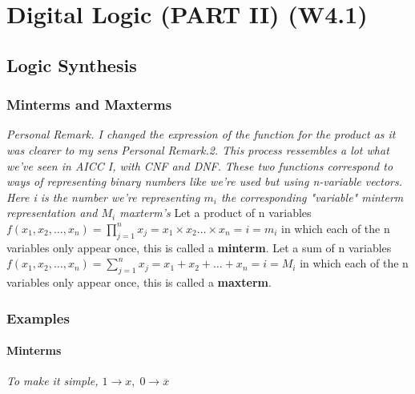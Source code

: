 \documentclass[12pt,openany]{book}
\begin{document}
			      	        
			      	        
			      	\chapter{Digital Logic (PART II) (W4.1)}
			      	\section{Logic Synthesis}
			      	\subsection{Minterms and Maxterms}
			      	\textit{Personal Remark. I changed the expression of the function for the product as it was clearer to my sens} \newline
			      	\vspace{10px}
			      	\textit{Personal Remark.2. This process ressembles a lot what we've seen in AICC I, with CNF and DNF.} \newline
			      	\vspace{10px}
			      	\textit{These two functions correspond to ways of representing binary numbers like we're used but using n-variable vectors. Here i is the number we're representing $m_i$ the corresponding "variable" minterm representation and $M_i$ maxterm's}\newline
			      	\vspace{10px}
			      	Let a product of n variables $f(x_{1}, x_{2}, \ldots, x_{n}) = \prod_{j=1}^{n}x_{j} = x_{1} \times x_{2} \ldots \times x_n = i = m_i$ in which each of the n variables only appear once, this is called a \textbf{minterm}. \newline
			      	\vspace{5px}
			      	Let a sum of n variables $f(x_{1}, x_{2}, \ldots, x_{n}) = \sum_{j=1}^{n}x_{j} = x_{1} + x_{2} + \ldots + x_n = i = M_i$ in which each of the n variables only appear once, this is called a \textbf{maxterm}. \newline
			      	
			      	\vspace*{-10px}
			      	\subsection{Examples}
			      	\subsubsection*{Minterms}
			      	\textit{To make it simple, $1 \rightarrow x, \; 0 \rightarrow \overline{x} $} \newline
			      	
\end{document}
